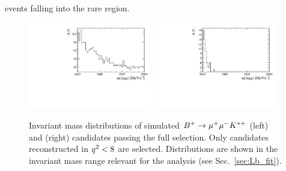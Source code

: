 events falling into the rare \qsq region.
%
\begin{figure}
\centering
\includegraphics[width=0.48\textwidth]{Lmumu/figs/Bu2Kstplus_mass.pdf}
\includegraphics[width=0.48\textwidth]{Lmumu/figs/JpsiL_leakage_mass.pdf}
\caption{ Invariant mass distributions of simulated $B^{+} \rightarrow{\ensuremath{\mu^+\mu^-}} K^{*+}$ (left)
and \Lb\to\jpsi\Lz (right) candidates passing the full selection. Only \Lb\to\jpsi\Lz
candidates reconstructed in ${q^2} < 8$ \gevgevcccc are selected.
Distributions are shown in the invariant mass range relevant for the analysis 
(see Sec.~\ref{sec:Lb_fit}). }
\label{fig:peakingBkgs}
\end{figure}

